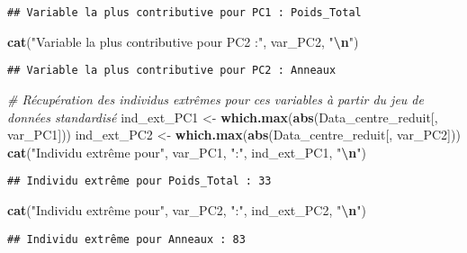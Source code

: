 \documentclass[
]{article}
\newenvironment{Shaded}{\begin{snugshade}}{\end{snugshade}}
\newcommand{\CommentTok}[1]{\textcolor[rgb]{0.56,0.35,0.01}{\textit{#1}}}
\newcommand{\FunctionTok}[1]{\textcolor[rgb]{0.13,0.29,0.53}{\textbf{#1}}}
\newcommand{\NormalTok}[1]{#1}
\newcommand{\OtherTok}[1]{\textcolor[rgb]{0.56,0.35,0.01}{#1}}
\newcommand{\SpecialCharTok}[1]{\textcolor[rgb]{0.81,0.36,0.00}{\textbf{#1}}}
\newcommand{\StringTok}[1]{\textcolor[rgb]{0.31,0.60,0.02}{#1}}
\begin{document}
\begin{verbatim}
## Variable la plus contributive pour PC1 : Poids_Total
\end{verbatim}

\begin{Shaded}
\begin{Highlighting}[]
\FunctionTok{cat}\NormalTok{(}\StringTok{"Variable la plus contributive pour PC2 :"}\NormalTok{, var\_PC2, }\StringTok{"}\SpecialCharTok{\textbackslash{}n}\StringTok{"}\NormalTok{)}
\end{Highlighting}
\end{Shaded}

\begin{verbatim}
## Variable la plus contributive pour PC2 : Anneaux
\end{verbatim}

\begin{Shaded}
\begin{Highlighting}[]
\CommentTok{\# Récupération des individus extrêmes pour ces variables à partir du jeu de données standardisé}
\NormalTok{ind\_ext\_PC1 }\OtherTok{\textless{}{-}} \FunctionTok{which.max}\NormalTok{(}\FunctionTok{abs}\NormalTok{(Data\_centre\_reduit[, var\_PC1]))}
\NormalTok{ind\_ext\_PC2 }\OtherTok{\textless{}{-}} \FunctionTok{which.max}\NormalTok{(}\FunctionTok{abs}\NormalTok{(Data\_centre\_reduit[, var\_PC2]))}
\FunctionTok{cat}\NormalTok{(}\StringTok{"Individu extrême pour"}\NormalTok{, var\_PC1, }\StringTok{":"}\NormalTok{, ind\_ext\_PC1, }\StringTok{"}\SpecialCharTok{\textbackslash{}n}\StringTok{"}\NormalTok{)}
\end{Highlighting}
\end{Shaded}

\begin{verbatim}
## Individu extrême pour Poids_Total : 33
\end{verbatim}

\begin{Shaded}
\begin{Highlighting}[]
\FunctionTok{cat}\NormalTok{(}\StringTok{"Individu extrême pour"}\NormalTok{, var\_PC2, }\StringTok{":"}\NormalTok{, ind\_ext\_PC2, }\StringTok{"}\SpecialCharTok{\textbackslash{}n}\StringTok{"}\NormalTok{)}
\end{Highlighting}
\end{Shaded}

\begin{verbatim}
## Individu extrême pour Anneaux : 83
\end{verbatim}
\end{document}
